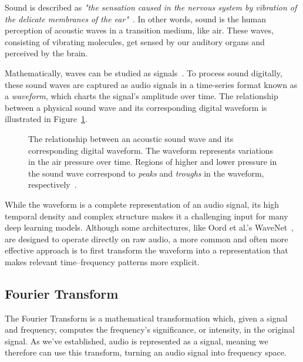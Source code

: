 Sound is described as \textit{"the sensation caused in the nervous system by vibration of the delicate membranes of the ear"}~\cite{1953fundamentals}. In other words, sound is the human perception of acoustic waves in a transition medium, like air. These waves, consisting of vibrating molecules, get sensed by our auditory organs and perceived by the brain. 

Mathematically, waves can be studied as signals~\cite{8454362}. To process sound digitally, these sound waves are captured as audio signals in a time-series format known as a \textit{waveform}, which charts the signal's amplitude over time. The relationship between a physical sound wave and its corresponding digital waveform is illustrated in Figure~\ref{WaveformFigure}.

\begin{figure}[H]
    \centering
    
    \caption{The relationship between an acoustic sound wave and its corresponding digital waveform. The waveform represents variations in the air pressure over time. Regions of higher and lower pressure in the sound wave correspond to \textit{peaks} and \textit{troughs} in the waveform, respectively~\cite{svantek2025}.}
    \label{WaveformFigure}
\end{figure}

While the waveform is a complete representation of an audio signal, its high temporal density and complex structure makes it a challenging input for many deep learning models. Although some architectures, like Oord et al.'s WaveNet~\cite{oord2016wavenetgenerativemodelraw}, are designed to operate directly on raw audio, a more common and often more effective approach is to first transform the waveform into a representation that makes relevant time–frequency patterns more explicit.

\subsection{Fourier Transform}

The Fourier Transform is a mathematical transformation which, given a signal and frequency, computes the frequency's significance, or intensity, in the original signal. As we've established, audio is represented as a signal, meaning we therefore can use this transform, turning an audio signal into frequency space. 

